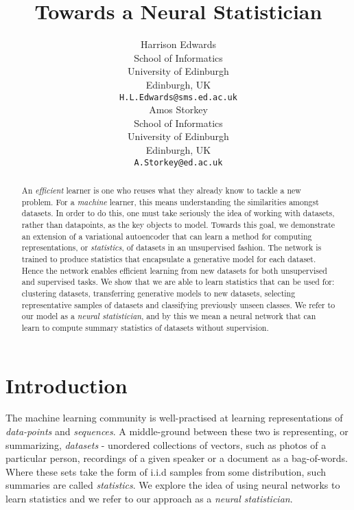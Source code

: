 \documentclass{article} \usepackage{iclr2017_conference,times}
\title{Towards a Neural Statistician}
\author{Harrison Edwards\\
  School of Informatics\\
  University of Edinburgh\\
  Edinburgh, UK \\
  \texttt{H.L.Edwards@sms.ed.ac.uk} \\
  \And Amos Storkey \\
  School of Informatics\\
  University of Edinburgh\\
  Edinburgh, UK \\
  \texttt{A.Storkey@ed.ac.uk} \\
}
\newcommand{\iid}{i.i.d }
\begin{document}
\maketitle

\begin{abstract}
An \emph{efficient} learner is one who reuses what they already know to tackle a new problem. For a \emph{machine} learner, this means understanding the similarities amongst datasets. In order to do this, one must take seriously the idea of working with datasets, rather than datapoints, as the key objects to model. Towards this goal, we demonstrate an extension of a variational autoencoder that can learn a method for computing representations, or \emph{statistics}, of datasets in an unsupervised fashion. The network is trained to produce statistics that encapsulate a generative model for each dataset. Hence the network enables efficient learning from new datasets for both unsupervised and supervised tasks. We show that we are able to learn statistics that can be used for: clustering datasets, transferring generative models to new datasets, selecting representative samples of datasets and classifying previously unseen classes. We refer to our model as a \emph{neural statistician}, and by this we mean a neural network that can learn to compute summary statistics of datasets without supervision.
\end{abstract}

\section{Introduction}

\label{introduction}
The machine learning community is well-practised at learning representations of \emph{data-points} and \emph{sequences}. A middle-ground between these two is representing, or summarizing, \emph{datasets} - unordered collections of vectors, such as photos of a particular person, recordings of a given speaker or a document as a bag-of-words. Where these sets take the form of \iid samples from some distribution, such summaries are called \emph{statistics}. We explore the idea of using neural networks to learn statistics and we refer to our approach as a \emph{neural statistician}.
\end{document}
